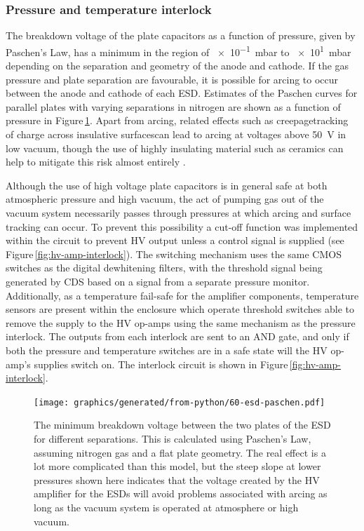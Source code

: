 \subsubsection{Pressure and temperature interlock}
The breakdown voltage of the plate capacitors as a function of pressure, given by Paschen's Law, has a minimum in the region of \SI{e-1}{\milli\bar} to \SI{e1}{\milli\bar} depending on the separation and geometry of the anode and cathode. If the gas pressure and plate separation are favourable, it is possible for arcing to occur between the anode and cathode of each \gls{ESD}. Estimates of the Paschen curves for parallel plates with varying separations in nitrogen are shown as a function of pressure in Figure\,\ref{fig:esd-paschen}. Apart from arcing, related effects such as creepage\textemdash tracking of charge across insulative surfaces\textemdash can lead to arcing at voltages above \SI{50}{\volt} in low vacuum, though the use of highly insulating material such as ceramics can help to mitigate this risk almost entirely \cite{EN2010}.

Although the use of high voltage plate capacitors is in general safe at both atmospheric pressure and high vacuum, the act of pumping gas out of the vacuum system necessarily passes through pressures at which arcing and surface tracking can occur. To prevent this possibility a cut-off function was implemented within the circuit to prevent \gls{HV} output unless a control signal is supplied (see Figure\,\ref{fig:hv-amp-interlock}). The switching mechanism uses the same \gls{CMOS} switches as the digital dewhitening filters, with the threshold signal being generated by \gls{CDS} based on a signal from a separate pressure monitor. Additionally, as a temperature fail-safe for the amplifier components, temperature sensors are present within the enclosure which operate threshold switches able to remove the supply to the \gls{HV} op-amps using the same mechanism as the pressure interlock. The outputs from each interlock are sent to an AND gate, and only if both the pressure and temperature switches are in a safe state will the \gls{HV} op-amp's supplies switch on. The interlock circuit is shown in Figure\,\ref{fig:hv-amp-interlock}.

\begin{figure}
  \centering
  \texttt{[image: graphics/generated/from-python/60-esd-paschen.pdf]}
  \caption[Minimum breakdown voltage between the two plates of the electrostatic drive for different separations]{\label{fig:esd-paschen}The minimum breakdown voltage between the two plates of the \gls{ESD} for different separations. This is calculated using Paschen's Law, assuming nitrogen gas and a flat plate geometry. The real effect is a lot more complicated than this model, but the steep slope at lower pressures shown here indicates that the voltage created by the \gls{HV} amplifier for the \glspl{ESD} will avoid problems associated with arcing as long as the vacuum system is operated at atmosphere or high vacuum.}
\end{figure}

